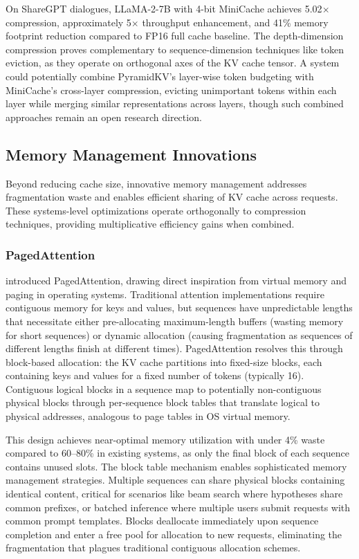 On ShareGPT dialogues, LLaMA-2-7B with 4-bit MiniCache achieves 5.02$\times$ compression, approximately 5$\times$ throughput enhancement, and 41\% memory footprint reduction compared to FP16 full cache baseline. The depth-dimension compression proves complementary to sequence-dimension techniques like token eviction, as they operate on orthogonal axes of the KV cache tensor. A system could potentially combine PyramidKV's layer-wise token budgeting with MiniCache's cross-layer compression, evicting unimportant tokens within each layer while merging similar representations across layers, though such combined approaches remain an open research direction.

\subsection{Memory Management Innovations}

Beyond reducing cache size, innovative memory management addresses fragmentation waste and enables efficient sharing of KV cache across requests. These systems-level optimizations operate orthogonally to compression techniques, providing multiplicative efficiency gains when combined.

\subsubsection{PagedAttention}

\citet{kwon2023efficient} introduced PagedAttention, drawing direct inspiration from virtual memory and paging in operating systems. Traditional attention implementations require contiguous memory for keys and values, but sequences have unpredictable lengths that necessitate either pre-allocating maximum-length buffers (wasting memory for short sequences) or dynamic allocation (causing fragmentation as sequences of different lengths finish at different times). PagedAttention resolves this through block-based allocation: the KV cache partitions into fixed-size blocks, each containing keys and values for a fixed number of tokens (typically 16). Contiguous logical blocks in a sequence map to potentially non-contiguous physical blocks through per-sequence block tables that translate logical to physical addresses, analogous to page tables in OS virtual memory.

This design achieves near-optimal memory utilization with under 4\% waste compared to 60--80\% in existing systems, as only the final block of each sequence contains unused slots. The block table mechanism enables sophisticated memory management strategies. Multiple sequences can share physical blocks containing identical content, critical for scenarios like beam search where hypotheses share common prefixes, or batched inference where multiple users submit requests with common prompt templates. Blocks deallocate immediately upon sequence completion and enter a free pool for allocation to new requests, eliminating the fragmentation that plagues traditional contiguous allocation schemes.

